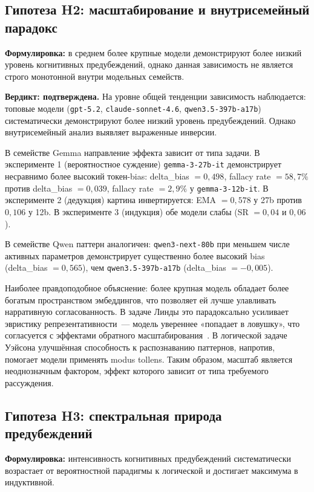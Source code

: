 \subsection{Гипотеза H2: масштабирование и внутрисемейный парадокс}

\textbf{Формулировка:} в среднем более крупные модели демонстрируют более низкий уровень когнитивных предубеждений, однако данная зависимость не является строго монотонной внутри модельных семейств.

\textbf{Вердикт: подтверждена.} На уровне общей тенденции зависимость наблюдается: топовые модели (\texttt{gpt-5.2}, \texttt{claude-sonnet-4.6}, \texttt{qwen3.5-397b-a17b}) систематически демонстрируют более низкий уровень предубеждений. Однако внутрисемейный анализ выявляет выраженные инверсии.

В семействе Gemma направление эффекта зависит от типа задачи. В эксперименте 1 (вероятностное суждение) \texttt{gemma-3-27b-it} демонстрирует несравнимо более высокий токен-bias: delta\_bias $= 0{,}498$, fallacy rate $= 58{,}7\%$ против delta\_bias $= 0{,}039$, fallacy rate $= 2{,}9\%$ у \texttt{gemma-3-12b-it}. В эксперименте 2 (дедукция) картина инвертируется: EMA $= 0{,}578$ у 27b против $0{,}106$ у 12b. В эксперименте 3 (индукция) обе модели слабы (SR $= 0{,}04$ и $0{,}06$).

В семействе Qwen паттерн аналогичен: \texttt{qwen3-next-80b} при меньшем числе активных параметров демонстрирует существенно более высокий bias (delta\_bias $= 0{,}565$), чем \texttt{qwen3.5-397b-a17b} (delta\_bias $= -0{,}005$).

Наиболее правдоподобное объяснение: более крупная модель обладает более богатым пространством эмбеддингов, что позволяет ей лучше улавливать нарративную согласованность. В задаче Линды это парадоксально усиливает эвристику репрезентативности~--- модель увереннее «попадает в ловушку», что согласуется с эффектами обратного масштабирования~\cite{dasgupta2024language}. В логической задаче Уэйсона улучшённая способность к распознаванию паттернов, напротив, помогает модели применять modus tollens. Таким образом, масштаб является неоднозначным фактором, эффект которого зависит от типа требуемого рассуждения.

\subsection{Гипотеза H3: спектральная природа предубеждений}

\textbf{Формулировка:} интенсивность когнитивных предубеждений систематически возрастает от вероятностной парадигмы к логической и достигает максимума в индуктивной.

